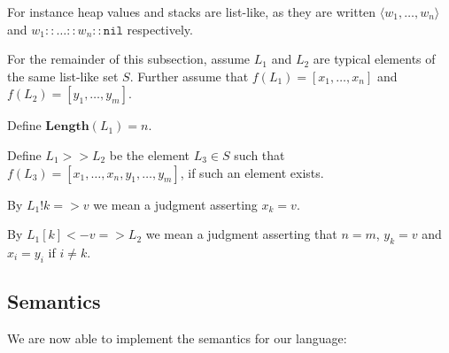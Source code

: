 For instance heap values and stacks are list-like, as they are written
$\langle w_1, \dots, w_n \rangle$ and $w_1 :: \dots :: w_n :: \mathtt{nil}$
respectively.

For the remainder of this subsection, assume $L_1$ and $L_2$ are typical
elements of the same list-like set $S$. Further assume that
$f(L_1) = [x_1, \dots, x_n]$ and $f(L_2) = [y_1, \dots, y_m]$.

Define $\mathbf{Length}(L_1) = n$.

Define $L_1 >> L_2$ be the element $L_3 \in S$ such that
$f(L_3) = [x_1, \dots, x_n, y_1, \dots, y_m]$, if such an element exists.

By $L_1 ! k => v$ we mean a judgment asserting $x_k = v$.

By $L_1[k]<- v => L_2$ we mean a judgment asserting that $n=m$, $y_k=v$ and
$x_i = y_i$ if $i \neq k$.

\subsection{Semantics}

We are now able to implement the semantics for our language: \\


